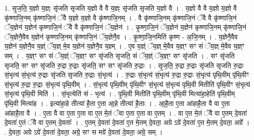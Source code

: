 \documentclass[17pt]{extarticle}
\begin{document}
1. सृ॒ज॒ति॒ य॒ज्ञो य॒ज्ञ्ः सृ॑जति सृजति य॒ज्ञो वै वै य॒ज्ञ्ः सृ॑जति सृजति य॒ज्ञो वै । . य॒ज्ञो वै वै य॒ज्ञो य॒ज्ञो वै कृ॑ष्णाजि॒नम् कृ॑ष्णाजि॒नं ॅवै य॒ज्ञो य॒ज्ञो वै कृ॑ष्णाजि॒नम् । . वै कृ॑ष्णाजि॒नम् कृ॑ष्णाजि॒नं ॅवै वै कृ॑ष्णाजि॒नं ॅय॒ज्ञेन॑ य॒ज्ञेन॑ कृष्णाजि॒नं ॅवै वै कृ॑ष्णाजि॒नं ॅय॒ज्ञेन॑ । . कृ॒ष्णा॒जि॒नं ॅय॒ज्ञेन॑ य॒ज्ञेन॑ कृष्णाजि॒नम् कृ॑ष्णाजि॒नं ॅय॒ज्ञेनै॒वैव य॒ज्ञेन॑ कृष्णाजि॒नम् कृ॑ष्णाजि॒नं ॅय॒ज्ञेनै॒व । . कृ॒ष्णा॒जि॒नमिति॑ कृष्ण - अ॒जि॒नम् । . य॒ज्ञेनै॒वैव य॒ज्ञेन॑ य॒ज्ञेनै॒व य॒ज्ञ्ं ॅय॒ज्ञ् मे॒व य॒ज्ञेन॑ य॒ज्ञेनै॒व य॒ज्ञ्म् । . ए॒व य॒ज्ञ्ं ॅय॒ज्ञ् मे॒वैव य॒ज्ञ्ꣳ सꣳ सं ॅय॒ज्ञ् मे॒वैव य॒ज्ञ्ꣳ सम् । . य॒ज्ञ्ꣳ सꣳ सं ॅय॒ज्ञ्ं ॅय॒ज्ञ्ꣳ सꣳ सृ॑जति सृजति॒ सं ॅय॒ज्ञ्ं ॅय॒ज्ञ्ꣳ सꣳ सृ॑जति । . सꣳ सृ॑जति सृजति॒ सꣳ सꣳ सृ॑जति रु॒द्रा रु॒द्राः सृ॑जति॒ सꣳ सꣳ सृ॑जति रु॒द्राः । . सृ॒ज॒ति॒ रु॒द्रा रु॒द्राः सृ॑जति सृजति रु॒द्राः सं॒भृत्य॑ सं॒भृत्य॑ रु॒द्राः सृ॑जति सृजति रु॒द्राः सं॒भृत्य॑ । . रु॒द्राः सं॒भृत्य॑ सं॒भृत्य॑ रु॒द्रा रु॒द्राः सं॒भृत्य॑ पृथि॒वीम् पृ॑थि॒वीꣳ सं॒भृत्य॑ रु॒द्रा रु॒द्राः सं॒भृत्य॑ पृथि॒वीम् । . सं॒भृत्य॑ पृथि॒वीम् पृ॑थि॒वीꣳ सं॒भृत्य॑ सं॒भृत्य॑ पृथि॒वी मितीति॑ पृथि॒वीꣳ सं॒भृत्य॑ सं॒भृत्य॑ पृथि॒वी मिति॑ । . सं॒भृत्येति॑ सं - भृत्य॑ । . पृ॒थि॒वी मितीति॑ पृथि॒वीम् पृ॑थि॒वी मित्या॑हा॒हेति॑ पृथि॒वीम् पृ॑थि॒वी मित्या॑ह । . इत्या॑हा॒हे तीत्या॑ है॒ता ए॒ता आ॒हे तीत्या॑ है॒ताः । . आ॒है॒ता ए॒ता आ॑हाहै॒ता वै वा ए॒ता आ॑हाहै॒ता वै । . ए॒ता वै वा ए॒ता ए॒ता वा ए॒त मे॒तं ॅवा ए॒ता ए॒ता वा ए॒तम् । . वा ए॒त मे॒तं ॅवै वा ए॒तम् दे॒वता॑ दे॒वता॑ ए॒तं ॅवै वा ए॒तम् दे॒वताः᳚ । . ए॒तम् दे॒वता॑ दे॒वता॑ ए॒त मे॒तम् दे॒वता॒ अग्रे ऽग्रे॑ दे॒वता॑ ए॒त मे॒तम् दे॒वता॒ अग्रे᳚ । . दे॒वता॒ अग्रे ऽग्रे॑ दे॒वता॑ दे॒वता॒ अग्रे॒ सꣳ स मग्रे॑ दे॒वता॑ दे॒वता॒ अग्रे॒ सम् । \newline
\end{document}
